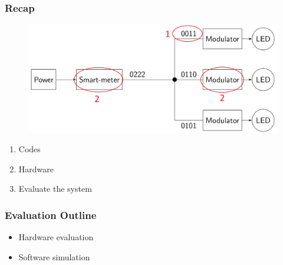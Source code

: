 \documentclass{beamer}
\begin{document}
	\begin{frame}\frametitle{Recap}

		\begin{figure}
			\centering
			\includegraphics[width=\textwidth]{contributions-figure.png}
		\end{figure}
		\begin{enumerate}
				\item Codes
				\item Hardware
				\item Evaluate the system
		\end{enumerate}
		

	\end{frame}




	\begin{frame}\frametitle{Evaluation Outline}

		\begin{itemize}

			\item Hardware evaluation

			\item Software simulation

		\end{itemize}
	\end{frame}
\end{document}
